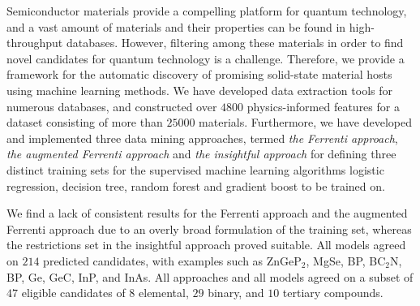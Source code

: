 Semiconductor materials provide a compelling platform for quantum technology, and a vast amount of materials and their properties can be found in high-throughput databases.
However, filtering among these materials in order to find novel candidates for quantum technology is a challenge. Therefore, we provide a framework for the automatic discovery of promising solid-state material hosts using machine learning methods.
We have developed data extraction tools for numerous databases, and constructed over $4800$ physics-informed features for a dataset consisting of more than $25000$ materials.
Furthermore, we have developed and implemented three data mining approaches, termed \textit{the Ferrenti approach}, \textit{the augmented Ferrenti approach} and \textit{the insightful approach} for defining three distinct training sets for the supervised machine learning algorithms logistic regression, decision tree, random forest and gradient boost to be trained on.

We find a lack of consistent results for the Ferrenti approach and the augmented Ferrenti approach due to an overly broad formulation of the training set, whereas the restrictions set in the insightful approach proved suitable. All models agreed on $214$ predicted candidates, with examples such as ZnGeP$_2$, MgSe, BP, BC$_2$N, BP, Ge, GeC, InP, and InAs. All approaches and all models agreed on a subset of $47$ eligible candidates of $8$ elemental, $29$ binary, and $10$ tertiary compounds.





